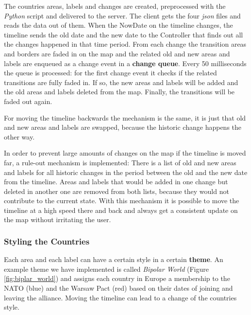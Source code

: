 The countries areas, labels and changes are created, preprocessed with the \textit{Python} script and delivered to the server. The client gets the four \textit{json} files and reads the data out of them. When the NowDate on the timeline changes, the timeline sends the old date and the new date to the Controller that finds out all the changes happened in that time period. From each change the transition areas and borders are faded in on the map and the related old and new areas and labels are enqueued as a change event in a \textbf{change queue}. Every 50 milliseconds the queue is processed: for the first change event it checks if the related transitions are fully faded in. If so, the new areas and labels will be added and the old areas and labels deleted from the map. Finally, the transitions will be faded out again.

For moving the timeline backwards the mechanism is the same, it is just that old and new areas and labels are swapped, because the historic change happens the other way.

In order to prevent large amounts of changes on the map if the timeline is moved far, a rule-out mechanism is implemented: There is a list of old and new areas and labels for all historic changes in the period between the old and the new date from the timeline. Areas and labels that would be added in one change but deleted in another one are removed from both lists, because they would not contribute to the current state. With this mechanism it is possible to move the timeline at a high speed there and back and always get a consistent update on the map without irritating the user.


\subsubsection{Styling the Countries} %
\label{ssub:styling_the_countries}

Each area and each label can have a certain style in a certain \textbf{theme}. An example theme we have implemented is called \textit{Bipolar World} (Figure \ref{fig:biplar_world}) and assigns each country in Europe a membership to the NATO (blue) and the Warsaw Pact (red) based on their dates of joining and leaving the alliance. Moving the timeline can lead to a change of the countries style.

